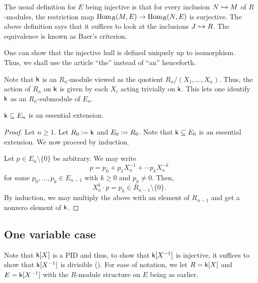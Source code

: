 \begin{rem}
	The usual definition for $E$ being injective is that for every inclusion $N \hookrightarrow M$ of $R$-modules, the restriction map $\operatorname{Hom}_{R}(M, E) \to \operatorname{Hom}_{R}(N, E)$ is surjective. The above definition says that it suffices to look at the inclusions $J \hookrightarrow R$. The equivalence is known as Baer's criterion.
\end{rem}

\begin{rem}
	One can show that the injective hull is defined uniquely up to isomorphism. Thus, we shall use the article ``the'' instead of ``an'' henceforth.
\end{rem}

Note that $\mathsf{k}$ is an $R_{n}$-module viewed as the quotient $R_{n}/(X_{1}, \ldots, X_{n})$. Thus, the action of $R_{n}$ on $\mathsf{k}$ is given by each $X_{i}$ acting trivially on $\mathsf{k}$. This lets one identify $\mathsf{k}$ as an $R_{n}$-submodule of $E_{n}$.

\begin{prop}
	$\mathsf{k} \subseteq E_{n}$ is an essential extension.
\end{prop}
\begin{proof} 
	Let $n \ge 1$. Let $R_{0} \vcentcolon= \mathsf{k}$ and $E_{0} \vcentcolon= R_{0}$. Note that $\mathsf{k} \subseteq E_{0}$ is an essential extension. We now proceed by induction.

	Let $p \in E_{n} \setminus \{0\}$ be arbitrary. We may write
	\begin{equation*} 
		p = p_{0} + p_{1} X_{n}^{-1} + \cdots p_{k} X_{n}^{-k}
	\end{equation*}
	for some $p_{0}, \ldots, p_{k} \in E_{n - 1}$ with $k \ge 0$ and $p_{k} \neq 0$. Then,
	\begin{equation*} 
		X_{n}^{k} \cdot p = p_{k} \in R_{n - 1} \setminus \{0\}.
	\end{equation*}
	By induction, we may multiply the above with an element of $R_{n - 1}$ and get a nonzero element of $\mathsf{k}$.
\end{proof}

\subsection{One variable case}

Note that $\mathsf{k}[X]$ is a PID and thus, to show that $\mathsf{k}[X^{-1}]$ is injective, it suffices to show that $\mathsf{k}[X^{-1}]$ is divisible (). For ease of notation, we let $R = \mathsf{k}[X]$ and $E = \mathsf{k}[X^{-1}]$ with the $R$-module structure on $E$ being as earlier.


